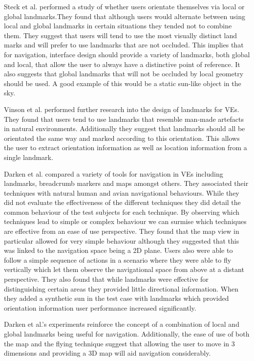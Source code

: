 \documentclass{sig-alternate-05-2015}
\begin{document}
Steck et al. performed a study of whether users orientate themselves via local or global landmarks\cite{Steck2000}.They found that although users would alternate between using local and global landmarks in certain situations they tended not to combine them. They suggest that users will tend to use the most visually distinct land marks and will prefer to use landmarks that are not occluded. This implies that for navigation, interface design should provide a variety of landmarks, both global and local, that allow the user to always have a distinctive point of reference. It also suggests that global landmarks that will not be occluded by local geometry should be used. A good example of this would be a static sun-like object in the sky.

Vinson et al. performed further research into the design of landmarks for VEs.\cite{Vinson1999} They found that users tend to use landmarks that resemble man-made artefacts in natural environments. Additionally they suggest that landmarks should all be orientated the same way and marked according to this orientation. This allows the user to extract orientation information as well as location information from a single landmark.

Darken et al. compared a variety of tools for navigation in VEs including landmarks, breadcrumb markers and maps amongst others\cite{Darken1993}. They associated their techniques with natural human and avian  navigational behaviours. While they did not evaluate the effectiveness of the different techniques they did detail the common behaviour of the test subjects for each technique. By observing which techniques lead to simple or complex behaviour we can surmise which techniques are effective from an ease of use perspective. They found that the map view in particular allowed for very simple behaviour although they suggested that this was linked to the navigation space being a 2D plane. Users also were able to follow a simple sequence of actions in a scenario where they were able to fly vertically which let them observe the navigational space from above at a distant perspective. They also found that while landmarks were effective for distinguishing certain areas they provided little directional information. When they added a synthetic sun in the test case with landmarks which provided orientation information user performance increased significantly.

Darken et al.'s experiments reinforce the concept of a combination of local and global landmarks being useful for navigation.\cite{Darken1993} Additionally, the ease of use of both the map and the flying technique suggest that allowing the user to move in 3 dimensions and providing a 3D map will aid navigation considerably. 
\end{document}
